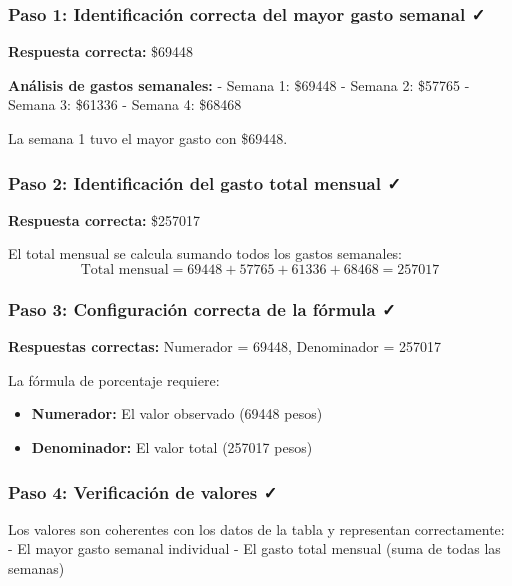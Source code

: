 \documentclass[
]{article}
\providecommand{\tightlist}{%
  \setlength{\itemsep}{0pt}\setlength{\parskip}{0pt}}
\begin{document}
\subsubsection{Paso 1: Identificación correcta del mayor gasto semanal
✓}\label{paso-1-identificaciuxf3n-correcta-del-mayor-gasto-semanal}

\textbf{Respuesta correcta:} \$69448

\textbf{Análisis de gastos semanales:} - Semana 1: \$69448 - Semana 2:
\$57765 - Semana 3: \$61336 - Semana 4: \$68468

La semana 1 tuvo el mayor gasto con \$69448.

\subsubsection{Paso 2: Identificación del gasto total mensual
✓}\label{paso-2-identificaciuxf3n-del-gasto-total-mensual-1}

\textbf{Respuesta correcta:} \$257017

El total mensual se calcula sumando todos los gastos semanales:
\[\text{Total mensual} = 69448 + 57765 + 61336 + 68468 = 257017\]

\subsubsection{Paso 3: Configuración correcta de la fórmula
✓}\label{paso-3-configuraciuxf3n-correcta-de-la-fuxf3rmula}

\textbf{Respuestas correctas:} Numerador = 69448, Denominador = 257017

La fórmula de porcentaje requiere:

\begin{itemize}
\tightlist
\item
  \textbf{Numerador:} El valor observado (69448 pesos)
\item
  \textbf{Denominador:} El valor total (257017 pesos)
\end{itemize}

\subsubsection{Paso 4: Verificación de valores
✓}\label{paso-4-verificaciuxf3n-de-valores-1}

Los valores son coherentes con los datos de la tabla y representan
correctamente: - El mayor gasto semanal individual - El gasto total
mensual (suma de todas las semanas)
\end{document}

